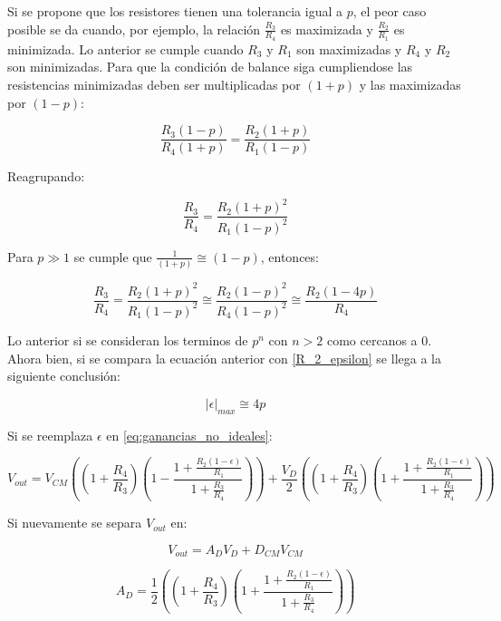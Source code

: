 Si se propone que los resistores tienen una tolerancia igual a $p$, el peor caso posible se da cuando, por ejemplo, la relación $\frac{R_3}{R_4}$ es maximizada y $\frac{R_2}{R_1}$ es minimizada. Lo anterior se cumple cuando $R_3$ y $R_1$ son maximizadas y $R_4$ y $R_2$ son minimizadas. Para que la condición de balance siga cumpliendose las resistencias minimizadas deben ser multiplicadas por $(1 + p)$ y las maximizadas por $(1 - p)$:

\begin{equation}
\frac{R_3(1 - p)}{R_4(1 + p)} = \frac{R_2(1 + p)}{R_1(1 - p)}
\end{equation}

Reagrupando:

\begin{equation}
\frac{R_3}{R_4} = \frac{R_2(1 + p)^2}{R_1(1 - p)^2}
\end{equation}

Para $p \gg 1$ se cumple que  $\frac{1}{(1 + p)} \cong (1 - p)$, entonces:

\begin{equation}
\frac{R_3}{R_4} = \frac{R_2(1 + p)^2}{R_1(1 - p)^2} \cong	 \frac{R_2(1 - p)^2}{R_4(1 - p)^2} \cong \frac{R_2(1 - 4p)}{R_4}
\end{equation}

Lo anterior si se consideran los terminos de $p^n$ con $n > 2$ como cercanos a $0$. Ahora bien, si se compara la ecuación anterior con \ref{R_2_epsilon} se llega a la siguiente conclusión:

\begin{equation}
|\epsilon|_{max} \cong 4p
\end{equation}



Si se reemplaza $\epsilon$ en \ref{eq:ganancias_no_ideales}:

\begin{equation}
V_{out} = V_{CM}((1 + \frac{R_4}{R_3})(1 - \frac{1 + \frac{R_2(1 - \epsilon)}{R_1}}{1 + \frac{R_3}{R_4}})) + \frac{V_D}{2}((1 + \frac{R_4}{R_3})(1 + \frac{1 + \frac{R_2(1 - \epsilon)}{R_1}}{1 + \frac{R_3}{R_4}}))
\end{equation}

Si nuevamente se separa $V_{out}$ en:

\begin{equation}
V_{out} = A_DV_D + D_{CM}V_{CM}
\end{equation}

\begin{equation}
A_D = \frac{1}{2}((1 + \frac{R_4}{R_3})(1 + \frac{1 + \frac{R_2(1 - \epsilon)}{R_1}}{1 + \frac{R_3}{R_4}}))
\end{equation}

